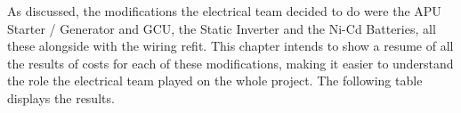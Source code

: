 As discussed, the modifications the electrical team decided to do were the APU Starter / Generator and GCU, the Static Inverter and the Ni-Cd Batteries, all these alongside with the wiring refit. This chapter intends to show a resume of all the results of costs for each of these modifications, making it easier to understand the role the electrical team played on the whole project. The following table displays the results.

\begin{figure}[H] %
\label{fig:ELECostSum1}
\end{figure}

\begin{figure}[H] %
\label{fig:ELECostSum2}
\end{figure}
